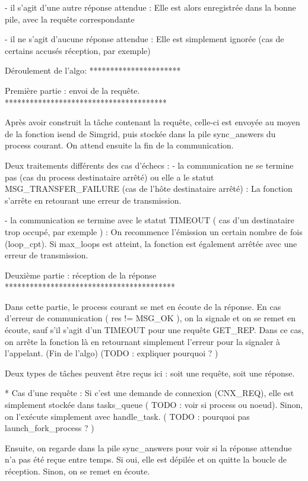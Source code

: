 - il s'agit d'une autre réponse attendue :
  Elle est alors enregistrée dans la bonne pile, avec la requête correspondante

- il ne s'agit d'aucune réponse attendue :
  Elle est simplement ignorée (cas de certains accusés réception, par exemple)

Déroulement de l'algo:
**********************

Première partie : envoi de la requête.
***************************************

Après avoir construit la tâche contenant la requête, celle-ci est envoyée au moyen de la fonction
isend de Simgrid, puis stockée dans la pile sync_answers du process courant.
On attend ensuite la fin de la communication.

Deux traitements différents des cas d'échecs :
- la communication ne se termine pas (cas du process destinataire arrêté) ou elle a le statut
  MSG_TRANSFER_FAILURE (cas de l'hôte destinataire arrêté) :
  La fonction s'arrête en retourant une erreur de transmission.

- la communication se termine avec le statut TIMEOUT ( cas d'un destinataire trop occupé, par
  exemple ) :
  On recommence l'émission un certain nombre de fois (loop_cpt).
  Si max_loops est atteint, la fonction est également arrêtée avec une erreur de transmission.


Deuxième partie : réception de la réponse
*****************************************

Dans cette partie, le process courant se met en écoute de la réponse. En cas d'erreur de communication
( res != MSG_OK ), on la signale et on se remet en écoute, sauf s'il s'agit d'un TIMEOUT pour une
requête GET_REP. Dans ce cas, on arrête la fonction là en retournant simplement l'erreur pour la
signaler à l'appelant. (Fin de l'algo) (TODO : expliquer pourquoi ? )

Deux types de tâches peuvent être reçus ici : soit une requête, soit une réponse.

* Cas d'une requête :
  Si c'est une demande de connexion (CNX_REQ), elle est simplement stockée dans tasks_queue ( TODO :
  voir si process ou noeud). Sinon, on l'exécute simplement avec handle_task. ( TODO : pourquoi pas
  launch_fork_process ? )

  Ensuite, on regarde dans la pile sync_answers pour voir si la réponse attendue n'a pas été reçue
  entre temps. Si oui, elle est dépilée et on quitte la boucle de réception. Sinon, on se remet en
  écoute.

